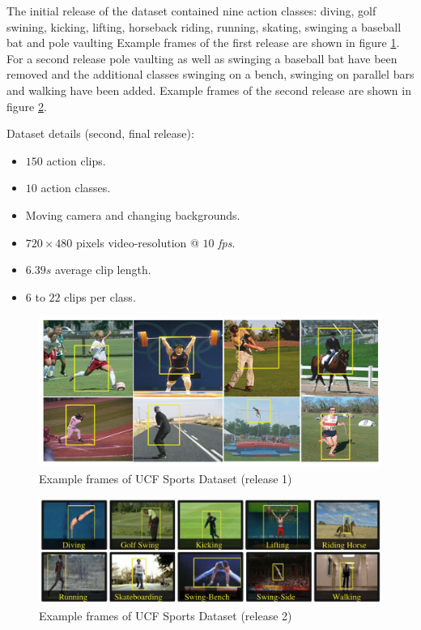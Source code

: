 The initial release of the dataset \cite{rodriguez_action_2008} contained nine action classes: diving, golf swining, kicking, lifting, horseback riding, running, skating, swinging a baseball bat and pole vaulting
Example frames of the first release are shown in figure \ref{fig:ucfsports1_example}.
For a second release \cite{soomro_action_2014} pole vaulting as well as swinging a baseball bat have been removed and the additional classes swinging on a bench, swinging on parallel bars and walking have been added.
Example frames of the second release are shown in figure \ref{fig:ucfsports2_example}.

Dataset details (second, final release): \cite{_center_????}
\begin{itemize}
    \item $150$ action clips.
    \item $10$ action classes.
    \item Moving camera and changing backgrounds.
    \item $720 \times 480$ pixels video-resolution @ $10$ \textit{fps}.
    \item $6.39s$ average clip length.
    \item $6$ to $22$ clips per class.
\end{itemize}

\begin{figure}[H]
    \centering
    \includegraphics[width=\textwidth]{img_datasets/ucfsports1_example}
    \caption{Example frames of UCF Sports Dataset (release 1) \cite{rodriguez_action_2008}}
    \label{fig:ucfsports1_example}
\end{figure}

\begin{figure}[H]
    \centering
    \includegraphics[width=\textwidth]{img_datasets/ucfsports2_example}
    \caption{Example frames of UCF Sports Dataset (release 2) \cite{soomro_action_2014}}
    \label{fig:ucfsports2_example}
\end{figure}


